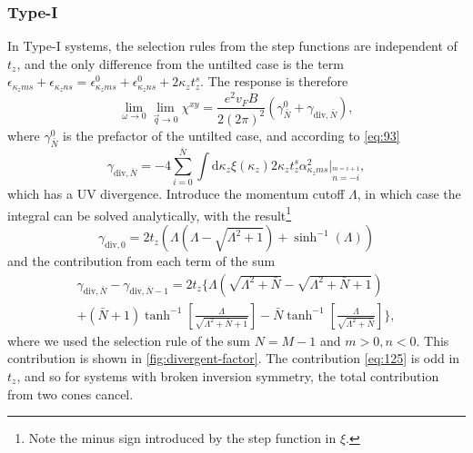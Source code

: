 \subsubsection{Type-I}
In Type-I systems, the selection rules from the step functions are independent of \( t_z \), and the only difference from the untilted case is the term \( \epsilon_{\kappa_z m s} + \epsilon_{\kappa_z n s} = \epsilon^0_{\kappa_z m s} + \epsilon^0_{\kappa_z n s} + 2 \kappa_z t^s_z \).
The response is therefore
\begin{equation}
  \label{eq:122}
  \lim_{\omega \to 0} \lim_{\vec{q} \to 0} \chi^{xy} = \frac{e^2v_F B}{2 (2\pi)^2} (\gamma_{\bar{N}}^0 + \gamma_{\text{div}, {\bar{N}}}),
\end{equation}
where \( \gamma_{\bar{N}}^0 \) is the prefactor of the untilted case, and according to \cref{eq:93}
\begin{equation}
  \label{eq:123}
  \gamma_{\text{div}, {\bar{N}}} = -4 \sum\limits_{i=0}^{{\bar{N}}} \int \mathrm{d} \kappa_z \xi(\kappa_z)
  2 \kappa_z t^s_z \alpha_{\kappa_z m s}^2 \Big|_{\overset{m=i+1}{n=-i}},
\end{equation}
which has a UV divergence.
Introduce the momentum cutoff \( \Lambda \), in which case the integral can be solved analytically, with the result\footnote{Note the minus sign introduced by the step function in \( \xi \).}
\begin{equation}
  \label{eq:124}
  \gamma_{\text{div}, 0} = 2 t_z \left(\Lambda  \left(\Lambda -\sqrt{\Lambda ^2+1}\right)+\sinh ^{-1}(\Lambda
   )\right)
\end{equation}
and the contribution from each term of the sum
\begin{multline}
  \gamma_{\text{div}, {\bar{N}}} - \gamma_{\text{div}, {\bar{N}}-1} =
  2 t_z
  \Bigg\{
    \Lambda\left(\sqrt{\Lambda^2 + \bar{N}} - \sqrt{\Lambda^2 + \bar{N} + 1}  \right)\\
    + (\bar{N} + 1) \tanh^{-1}\left[\frac{\Lambda}{\sqrt{\Lambda^2 + \bar{N} + 1} } \right]
    - \bar{N} \tanh^{-1}\left[\frac{\Lambda}{\sqrt{\Lambda^2 + \bar{N}}}\right]
    \Bigg\},
    \label{eq:125}
\end{multline}
where we used the selection rule of the sum \( N = M - 1 \) and \( m>0, n<0 \).
This contribution is shown in \cref{fig:divergent-factor}.
The contribution \eqref{eq:125} is odd in \( t_z \), and so for systems with broken inversion symmetry, the total contribution from two cones cancel.

